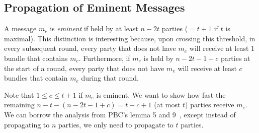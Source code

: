 \documentclass{article}
\begin{document}
\subsection{Propagation of Eminent Messages}
A message $m_e$ is \emph{eminent} if held by at least $n - 2t$ parties ($= t+1$ if $t$ is maximal). This distinction is interesting because, upon crossing this threshold, in every subsequent round, every party that does not have $m_e$ will receive at least 1 bundle that contains $m_e$. Furthermore, if $m_e$ is held by $n - 2t - 1 + c$ parties at the start of a round, every party that does not have $m_e$ will receive at least $c$ bundles that contain $m_e$ during that round. 

Note that $1 \leq c \leq t+1$ if $m_e$ is eminent. We want to show how fast the remaining $n - t - (n - 2t - 1 + c) = t - c + 1$ (at most $t$) parties receive $m_e$. We can borrow the analysis from PBC's lemma 5 and 9~\cite{PBC}, except instead of propagating to $n$ parties, we only need to propagate to $t$ parties. 
\end{document}
